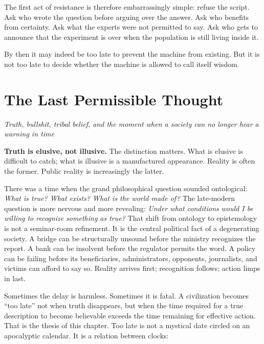 ﻿\documentclass[12pt,a4paper]{book}
\begin{document}
The first act of resistance is therefore embarrassingly simple: refuse the
script. Ask who wrote the question before arguing over the answer. Ask who
benefits from certainty. Ask what the experts were not permitted to say. Ask
who gets to announce that the experiment is over when the population is still
living inside it.

By then it may indeed be too late to prevent the machine from existing. But it
is not too late to decide whether the machine is allowed to call itself
wisdom.



\chapter{The Last Permissible Thought}
\label{ch:last-permissible-thought}

\begin{flushleft}
\large\itshape Truth, bullshit, tribal belief, and the moment when a society can no longer hear a warning in time
\end{flushleft}
\vspace{1.2em}

\noindent\textbf{Truth is elusive, not illusive.} The distinction matters. What is elusive is difficult to catch; what is illusive is a manufactured appearance. Reality is often the former. Public reality is increasingly the latter.

There was a time when the grand philosophical question sounded ontological: \emph{What is true? What exists? What is the world made of?} The late-modern question is more nervous and more revealing: \emph{Under what conditions would I be willing to recognize something as true?} That shift from ontology to epistemology is not a seminar-room refinement. It is the central political fact of a degenerating society. A bridge can be structurally unsound before the ministry recognizes the report. A bank can be insolvent before the regulator permits the word. A policy can be failing before its beneficiaries, administrators, opponents, journalists, and victims can afford to say so. Reality arrives first; recognition follows; action limps in last.

Sometimes the delay is harmless. Sometimes it is fatal. A civilization becomes “too late” not when truth disappears, but when the time required for a true description to become believable exceeds the time remaining for effective action. That is the thesis of this chapter. Too late is not a mystical date circled on an apocalyptic calendar. It is a relation between clocks:
\end{document}
